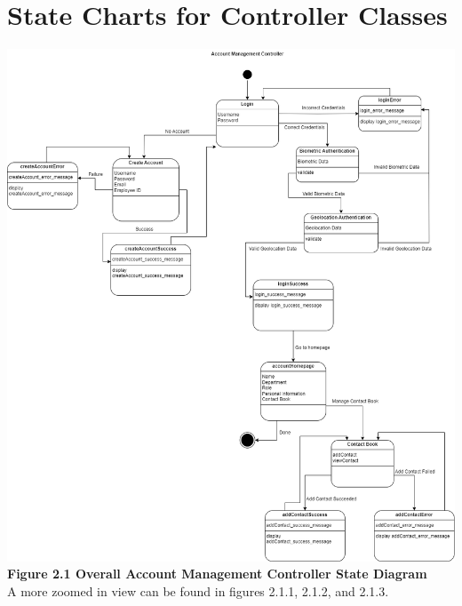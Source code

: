 \documentclass[]{article}
\begin{document}


\section{State Charts for Controller Classes}
\label{sec:state_charts_for_controller_classes}
\begin{center}
	\includegraphics[width=\textwidth]{../images/ControllerStateDiagrams/AccountManagementController.drawio.png}
	\textbf{Figure 2.1 Overall Account Management Controller State Diagram}
	\\A more zoomed in view can be found in figures 2.1.1, 2.1.2, and 2.1.3.

\end{center}
\end{document}
